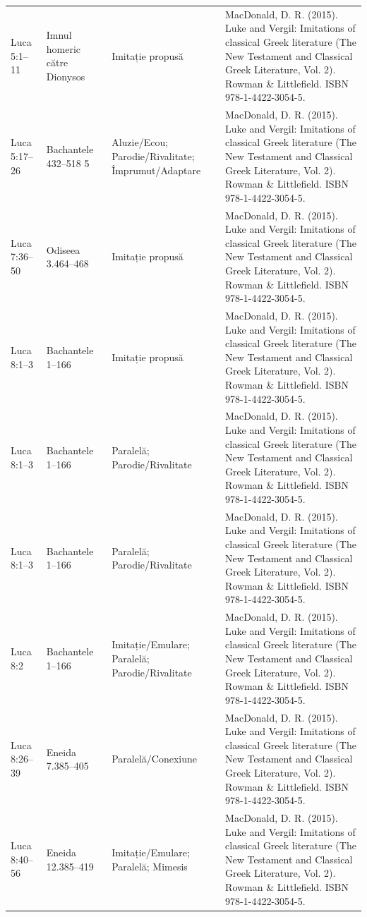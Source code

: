 \documentclass[12pt,a4paper,twoside,openany]{book}
\begin{document}
\begin{longtable}{L{1.4cm}L{1.7cm}L{3.1cm}L{8.4cm}}
Luca 5:1–11 & Imnul homeric către Dionysos & Imitație propusă & MacDonald, D. R. (2015). Luke and Vergil: Imitations of classical Greek literature (The New Testament and Classical Greek Literature, Vol. 2). Rowman \& Littlefield. ISBN 978-1-4422-3054-5. \\
Luca 5:17–26 & Bachantele 432–518 5 & Aluzie/Ecou; Parodie/Rivalitate; Împrumut/Adaptare & MacDonald, D. R. (2015). Luke and Vergil: Imitations of classical Greek literature (The New Testament and Classical Greek Literature, Vol. 2). Rowman \& Littlefield. ISBN 978-1-4422-3054-5. \\
Luca 7:36–50 & Odiseea 3.464–468 & Imitație propusă & MacDonald, D. R. (2015). Luke and Vergil: Imitations of classical Greek literature (The New Testament and Classical Greek Literature, Vol. 2). Rowman \& Littlefield. ISBN 978-1-4422-3054-5. \\
Luca 8:1–3 & Bachantele 1–166 & Imitație propusă & MacDonald, D. R. (2015). Luke and Vergil: Imitations of classical Greek literature (The New Testament and Classical Greek Literature, Vol. 2). Rowman \& Littlefield. ISBN 978-1-4422-3054-5. \\
Luca 8:1–3 & Bachantele 1–166 & Paralelă; Parodie/Rivalitate & MacDonald, D. R. (2015). Luke and Vergil: Imitations of classical Greek literature (The New Testament and Classical Greek Literature, Vol. 2). Rowman \& Littlefield. ISBN 978-1-4422-3054-5. \\
Luca 8:1–3 & Bachantele 1–166 & Paralelă; Parodie/Rivalitate & MacDonald, D. R. (2015). Luke and Vergil: Imitations of classical Greek literature (The New Testament and Classical Greek Literature, Vol. 2). Rowman \& Littlefield. ISBN 978-1-4422-3054-5. \\
Luca 8:2 & Bachantele 1–166 & Imitație/Emulare; Paralelă; Parodie/Rivalitate & MacDonald, D. R. (2015). Luke and Vergil: Imitations of classical Greek literature (The New Testament and Classical Greek Literature, Vol. 2). Rowman \& Littlefield. ISBN 978-1-4422-3054-5. \\
Luca 8:26–39 & Eneida 7.385–405 & Paralelă/Conexiune & MacDonald, D. R. (2015). Luke and Vergil: Imitations of classical Greek literature (The New Testament and Classical Greek Literature, Vol. 2). Rowman \& Littlefield. ISBN 978-1-4422-3054-5. \\
Luca 8:40–56 & Eneida 12.385–419 & Imitație/Emulare; Paralelă; Mimesis & MacDonald, D. R. (2015). Luke and Vergil: Imitations of classical Greek literature (The New Testament and Classical Greek Literature, Vol. 2). Rowman \& Littlefield. ISBN 978-1-4422-3054-5. \\

\end{longtable}
\end{document}
